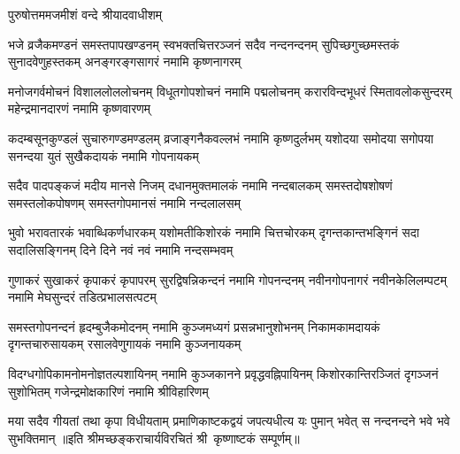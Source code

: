 
{पुरुषोत्तममजमीशं वन्दे श्रीयादवाधीशम्}

\fourlineindentedshloka
{भजे व्रजैकमण्डनं समस्तपापखण्डनम्}
{स्वभक्तचित्तरञ्जनं सदैव नन्दनन्दनम्}
{सुपिच्छगुच्छमस्तकं सुनादवेणुहस्तकम्}
{अनङ्गरङ्गसागरं नमामि कृष्णनागरम्}

\fourlineindentedshloka
{मनोजगर्वमोचनं विशाललोललोचनम्}
{विधूतगोपशोचनं नमामि पद्मलोचनम्}
{करारविन्दभूधरं स्मितावलोकसुन्दरम्}
{महेन्द्रमानदारणं नमामि कृष्णवारणम्}

\fourlineindentedshloka
{कदम्बसूनकुण्डलं सुचारुगण्डमण्डलम्}
{व्रजाङ्गनैकवल्लभं नमामि कृष्णदुर्लभम्}
{यशोदया समोदया सगोपया सनन्दया}
{युतं सुखैकदायकं नमामि गोपनायकम्}

\fourlineindentedshloka
{सदैव पादपङ्कजं मदीय मानसे निजम्}
{दधानमुक्तमालकं नमामि नन्दबालकम्}
{समस्तदोषशोषणं समस्तलोकपोषणम्}
{समस्तगोपमानसं नमामि नन्दलालसम्}

\fourlineindentedshloka
{भुवो भरावतारकं भवाब्धिकर्णधारकम्}
{यशोमतीकिशोरकं नमामि चित्तचोरकम्}
{दृगन्तकान्तभङ्गिनं सदा सदालिसङ्गिनम्}
{दिने दिने नवं नवं नमामि नन्दसम्भवम्}

\fourlineindentedshloka
{गुणाकरं सुखाकरं कृपाकरं कृपापरम्}
{सुरद्विषन्निकन्दनं नमामि गोपनन्दनम्}
{नवीनगोपनागरं नवीनकेलिलम्पटम्}
{नमामि मेघसुन्दरं तडित्प्रभालसत्पटम्}

\fourlineindentedshloka
{समस्तगोपनन्दनं हृदम्बुजैकमोदनम्}
{नमामि कुञ्जमध्यगं प्रसन्नभानुशोभनम्}
{निकामकामदायकं दृगन्तचारुसायकम्}
{रसालवेणुगायकं नमामि कुञ्जनायकम्}

\fourlineindentedshloka
{विदग्धगोपिकामनोमनोज्ञतल्पशायिनम्}
{नमामि कुञ्जकानने प्रवृद्धवह्निपायिनम्}
{किशोरकान्तिरञ्जितं दृगञ्जनं सुशोभितम्}
{गजेन्द्रमोक्षकारिणं नमामि श्रीविहारिणम्}

{मया सदैव गीयतां तथा कृपा विधीयताम्}
{प्रमाणिकाष्टकद्वयं जपत्यधीत्य यः पुमान्}
{भवेत् स नन्दनन्दने भवे भवे सुभक्तिमान्}
॥इति श्रीमच्छङ्कराचार्यविरचितं श्री~कृष्णाष्टकं सम्पूर्णम्॥